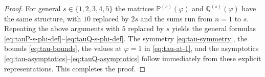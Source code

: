 \documentclass[10pt,a4paper]{amsart}
\begin{document}
\begin{proof}
For general $s\in\{1,2,3,4,5\}$ the matrices $\mathbb{P}^{(s)}(\varphi)$ and
$\mathbb{Q}^{(s)}(\varphi)$ have the same structure, with $10$ replaced by $2s$
and the sums run from $n=1$ to $s$. Repeating the above arguments with $5$
replaced by $s$ yields the general formulas
\eqref{eq:tauP-s-phi-def}--\eqref{eq:tauQ-s-phi-def}. The symmetry
\eqref{eq:tau-symmetry}, the bounds \eqref{eq:tau-bounds}, the values at
$\varphi=1$ in \eqref{eq:tau-at-1}, and the asymptotics
\eqref{eq:tau-asymptotics}--\eqref{eq:tauQ-asymptotics} follow immediately from
these explicit representations. This completes the proof.
\end{proof}
\end{document}
